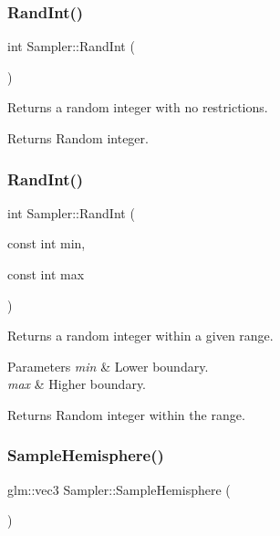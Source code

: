 \subsubsection{\texorpdfstring{Rand\+Int()}{RandInt()}\hspace{0.1cm}{\footnotesize\ttfamily [1/2]}}
{\footnotesize\ttfamily int Sampler\+::\+Rand\+Int (\begin{DoxyParamCaption}{ }\end{DoxyParamCaption})\hspace{0.3cm}{\ttfamily [protected]}}

Returns a random integer with no restrictions. \begin{DoxyReturn}{Returns}
Random integer. 
\end{DoxyReturn}
\hypertarget{class_sampler_a18b4fffc11fe530d4728d89843e975af}{}\label{class_sampler_a18b4fffc11fe530d4728d89843e975af} 
\subsubsection{\texorpdfstring{Rand\+Int()}{RandInt()}\hspace{0.1cm}{\footnotesize\ttfamily [2/2]}}
{\footnotesize\ttfamily int Sampler\+::\+Rand\+Int (\begin{DoxyParamCaption}\item[{const int}]{min,  }\item[{const int}]{max }\end{DoxyParamCaption})\hspace{0.3cm}{\ttfamily [protected]}}

Returns a random integer within a given range. 
\begin{DoxyParams}{Parameters}
{\em min} & Lower boundary. \\
\hline
{\em max} & Higher boundary. \\
\hline
\end{DoxyParams}
\begin{DoxyReturn}{Returns}
Random integer within the range. 
\end{DoxyReturn}
\hypertarget{class_sampler_a811c4a50a8767189491e6a5ab7d30cf9}{}\label{class_sampler_a811c4a50a8767189491e6a5ab7d30cf9} 
\subsubsection{\texorpdfstring{Sample\+Hemisphere()}{SampleHemisphere()}}
{\footnotesize\ttfamily glm\+::vec3 Sampler\+::\+Sample\+Hemisphere (\begin{DoxyParamCaption}{ }\end{DoxyParamCaption})}

